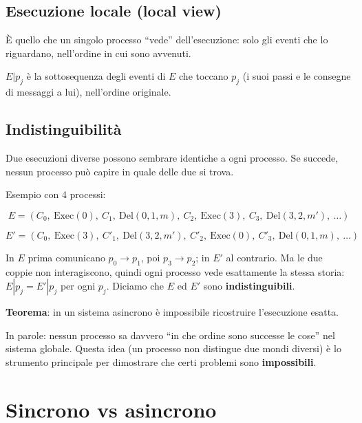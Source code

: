\subsection{Esecuzione locale (local view)}

\begin{inbreve}

È quello che un singolo processo ``vede'' dell'esecuzione: solo gli eventi che lo riguardano, nell'ordine in cui sono avvenuti.

\end{inbreve}

\(E|p_j\) è la sottosequenza degli eventi di \(E\) che toccano \(p_j\) (i suoi passi e le consegne di messaggi a lui), nell'ordine originale.

\subsection{Indistinguibilità}

\begin{inbreve}

Due esecuzioni diverse possono sembrare identiche a ogni processo. Se succede, nessun processo può capire in quale delle due si trova.

\end{inbreve}

Esempio con 4 processi:

\[
E = (C_0,\ \text{Exec}(0),\ C_1,\ \text{Del}(0,1,m),\ C_2,\ \text{Exec}(3),\ C_3,\ \text{Del}(3,2,m'),\ \dots)
\]

\[
E' = (C_0,\ \text{Exec}(3),\ C'_1,\ \text{Del}(3,2,m'),\ C'_2,\ \text{Exec}(0),\ C'_3,\ \text{Del}(0,1,m),\ \dots)
\]

In \(E\) prima comunicano \(p_0 \to p_1\), poi \(p_3 \to p_2\); in \(E'\) al contrario. Ma le due coppie non interagiscono, quindi ogni processo vede esattamente la stessa storia: \(E|p_j = E'|p_j\) per ogni \(p_j\). Diciamo che \(E\) ed \(E'\) sono \textbf{indistinguibili}.

\textbf{Teorema}: in un sistema asincrono è impossibile ricostruire l'esecuzione esatta.

In parole: nessun processo sa davvero ``in che ordine sono successe le cose'' nel sistema globale. Questa idea (un processo non distingue due mondi diversi) è lo strumento principale per dimostrare che certi problemi sono \textbf{impossibili}.

\section{Sincrono vs asincrono}

